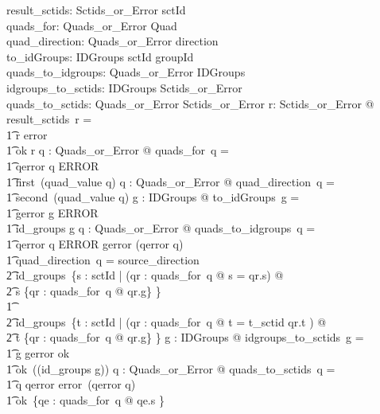 \documentclass{article}
\begin{document}
\begin{gendef}
   result\_sctids: Sctids\_or\_Error \fun \power sctId \\
   quads\_for: Quads\_or\_Error \fun \power Quad  \\
   quad\_direction: Quads\_or\_Error \pfun direction \\
   to\_idGroups: IDGroups \fun sctId \fun \power groupId \\
   quads\_to\_idgroups: Quads\_or\_Error \fun IDGroups \\
   idgroups\_to\_sctids: IDGroups \fun Sctids\_or\_Error \\
   quads\_to\_sctids: Quads\_or\_Error \fun Sctids\_or\_Error
\where
   \forall r: Sctids\_or\_Error @ result\_sctids~r = \\
\t1 \IF r \in \ran error \THEN \emptyset \\
\t1 \ELSE ok \inv r
\also
   \forall q : Quads\_or\_Error @ quads\_for~q = \\
\t1 \IF qerror \inv q \in ERROR \THEN \emptyset \\
\t1 \ELSE first~(quad\_value \inv q)
\also
   \forall q : Quads\_or\_Error @ quad\_direction~q = \\
\t1 second~(quad\_value \inv q)
\also
   \forall g : IDGroups @ to\_idGroups~g = \\
\t1 \IF gerror \inv g \in ERROR \THEN \emptyset \\
\t1 \ELSE id\_groups \inv g
\also
   \forall q : Quads\_or\_Error @ quads\_to\_idgroups~q = \\
\t1 \IF qerror  \inv q \in ERROR \THEN gerror (qerror \inv q) \\
\t1 \ELSE \IF quad\_direction~q = source\_direction \\
\t2 \THEN id\_groups~\{s : sctId | (\exists qr : quads\_for~q @ s = qr.s) @ \\
\t2 s \mapsto \{qr : quads\_for~q @ qr.g\} \} \\
\t1 \ELSE \\
\t2 id\_groups~\{t : sctId | (\exists qr : quads\_for~q @ t = t\_sctid \inv qr.t ) @ \\
\t2 t \mapsto \{qr : quads\_for~q @ qr.g\} \} 
\also
   \forall g : IDGroups @ idgroups\_to\_sctids~g = \\
\t1 \IF g \in \ran gerror \THEN ok~\emptyset \\
\t1 \ELSE ok~(\dom (id\_groups \inv g))
\also
   \forall q : Quads\_or\_Error @ quads\_to\_sctids~q = \\
\t1 \IF q \in \ran qerror \THEN error~(qerror \inv q) \\
\t1 \ELSE ok~\{qe : quads\_for~q @ qe.s \}
\end{gendef}
\end{document}
